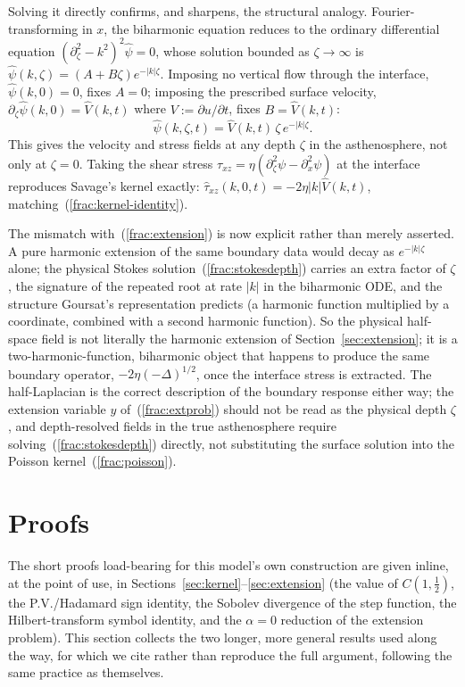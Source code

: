 \documentclass{article}
\begin{document}
Solving it directly confirms, and sharpens, the structural analogy.
Fourier-transforming in $x$, the biharmonic equation reduces to the
ordinary differential equation $(\partial_\zeta^2-k^2)^2\hat\psi=0$, whose
solution bounded as $\zeta\to\infty$ is
$\hat\psi(k,\zeta)=(A+B\zeta)e^{-|k|\zeta}$. Imposing no vertical flow
through the interface, $\hat\psi(k,0)=0$, fixes $A=0$; imposing the
prescribed surface velocity, $\partial_\zeta\hat\psi(k,0)=\hat V(k,t)$
where $V:=\partial u/\partial t$, fixes $B=\hat V(k,t)$:
\begin{equation}
\hat\psi(k,\zeta,t) = \hat V(k,t)\,\zeta\,e^{-|k|\zeta}.
\label{frac:stokesdepth}
\end{equation}
This gives the velocity and stress fields at any depth $\zeta$ in the
asthenosphere, not only at $\zeta=0$. Taking the shear stress
$\tau_{xz}=\eta(\partial_\zeta^2\psi-\partial_x^2\psi)$ at the interface
reproduces Savage's kernel exactly:
$\hat\tau_{xz}(k,0,t) = -2\eta|k|\hat V(k,t)$, matching~(\ref{frac:kernel-identity}).

The mismatch with~(\ref{frac:extension}) is now explicit rather than merely
asserted. A pure harmonic extension of the same boundary data would decay
as $e^{-|k|\zeta}$ alone; the physical Stokes solution~(\ref{frac:stokesdepth})
carries an extra factor of $\zeta$, the signature of the repeated root at
rate $|k|$ in the biharmonic ODE, and the structure Goursat's
representation predicts (a harmonic function multiplied by a coordinate,
combined with a second harmonic function). So the physical half-space
field is not literally the harmonic extension of
Section~\ref{sec:extension}; it is a two-harmonic-function, biharmonic
object that happens to produce the same boundary operator,
$-2\eta(-\Delta)^{1/2}$, once the interface stress is extracted. The
half-Laplacian is the correct description of the boundary response either
way; the extension variable $y$ of~(\ref{frac:extprob}) should not be read
as the physical depth $\zeta$, and depth-resolved fields in the true
asthenosphere require solving~(\ref{frac:stokesdepth}) directly, not
substituting the surface solution into the Poisson kernel~(\ref{frac:poisson}).

\section{Proofs}
\label{sec:proofs}

The short proofs load-bearing for this model's own construction are given
inline, at the point of use, in Sections~\ref{sec:kernel}--\ref{sec:extension}
(the value of $C(1,\tfrac12)$, the P.V./Hadamard sign identity, the Sobolev
divergence of the step function, the Hilbert-transform symbol identity, and
the $\alpha=0$ reduction of the extension problem). This section collects
the two longer, more general results used along the way, for which we cite
rather than reproduce the full argument, following the same practice as
\citet{daoud2022fractional} themselves.
\end{document}
